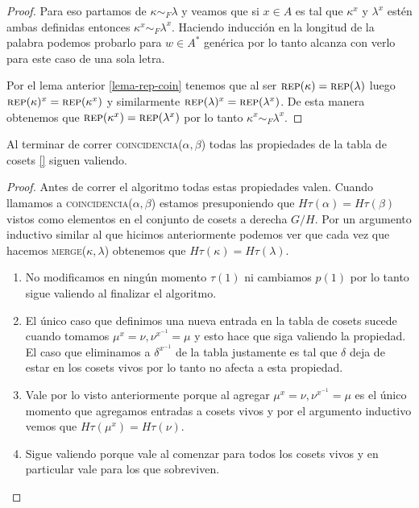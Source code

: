 \documentclass[tesis.tex]{subfiles}
\newcommand{\rep}{\textsc{rep}}
\newcommand{\coin}{\textsc{coincidencia}}
\newcommand{\mer}{\textsc{merge}}
\begin{document}
\begin{proof}
    Para eso partamos de $\kappa \sim_F \lambda$ y veamos que si $x \in A$ es tal que $\kappa^x$ y $\lambda^x$ estén ambas definidas entonces $\kappa^x \sim_F \lambda^x$.
    Haciendo inducción en la longitud de la palabra podemos probarlo para $w \in A^*$ genérica por lo tanto alcanza con verlo para este caso de una sola letra.
    
    Por el lema anterior \ref{lema-rep-coin} tenemos que al ser $\rep(\kappa) = \rep(\lambda )$ luego $\rep(\kappa)^x = \rep(\kappa^x)$ y similarmente $\rep(\lambda)^x = \rep(\lambda^x)$. 
    De esta manera obtenemos que $\rep (\kappa^x) = \rep(\lambda^x)$ por lo tanto $\kappa^x \sim_F \lambda^x$.
\end{proof}

\begin{prop}
	Al terminar de correr \coin($\alpha, \beta$) todas las propiedades de la tabla de cosets \ref{} siguen valiendo.
\end{prop}

\begin{proof}
	Antes de correr el algoritmo todas estas propiedades valen. 
	Cuando llamamos a \coin($\alpha, \beta$) estamos presuponiendo que $H\tau (\alpha) = H\tau(\beta)$ vistos como elementos en el conjunto de cosets a derecha $G/H$.
	Por un argumento inductivo similar al que hicimos anteriormente podemos ver que cada vez que hacemos \mer($\kappa, \lambda$) obtenemos que $H \tau (\kappa) = H \tau(\lambda)$. 
	\begin{enumerate}[P1.]
		\item No modificamos en ningún momento $\tau(1)$ ni cambiamos $p(1)$ por lo tanto sigue valiendo al finalizar el algoritmo.
		\item El único caso que definimos una nueva entrada en la tabla de cosets sucede cuando tomamos $\mu^x = \nu, \nu^{x^{-1}} = \mu$ y esto hace que siga valiendo la propiedad.
		El caso que eliminamos a $\delta^{x^{-1}}$ de la tabla justamente es tal que $\delta$ deja de estar en los cosets vivos por lo tanto no afecta a esta propiedad.
		\item Vale por lo visto anteriormente porque al agregar $\mu^x = \nu, \nu^{x^{-1}} = \mu$ es el único momento que agregamos entradas a cosets vivos y por el argumento inductivo vemos que $H\tau(\mu^x) = H\tau(\nu)$.
		\item Sigue valiendo porque vale al comenzar para todos los cosets vivos y en particular vale para los que sobreviven.
	\end{enumerate}
\end{proof}
\end{document}
